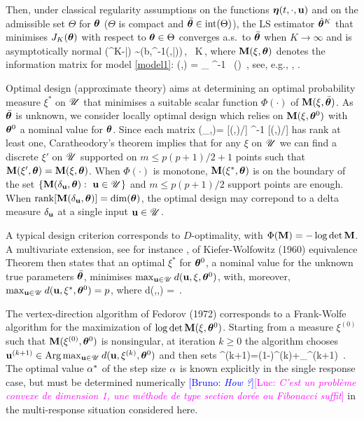 \documentclass{article}
\newcommand{\B}[1]{{\textcolor{blue}{[Bruno: \textit{#1}]}}}
\newcommand{\Luccomment}[1]{\todo[color=yellow]{#1}}
\newcommand{\Luc}[1]{{\textcolor{magenta}{[Luc: \textit{#1}]}}}
\begin{document}
Then, under classical regularity assumptions on the functions $\boldsymbol{\eta}(t,\cdot,\mathbf{u})$ and on the admissible set $\Theta$ for $\boldsymbol{\theta}$ ($\Theta$ is compact and $\bar{\boldsymbol{\theta}}\in \mathrm{int}(\Theta)$), the LS estimator $\hat{\boldsymbol{\theta}}^K$ that minimises $J_K(\boldsymbol{\theta})$ with respect to $\boldsymbol{\theta}\in\Theta$ converges a.s.\ to $\bar{\boldsymbol{\theta}}$ when $K\to\infty$ and is asymptotically normal
\bea
{} (\hat\mtb^K-\bar\mtb) \rad \zb \sim \SN\left(\0b,\Mb^{-1}(\xi,\bar\mtb)\right)\,, \ K\to\infty\,,
\eea
where $\mathbf{M}(\xi,\boldsymbol{\theta})$ denotes the information matrix for model \eqref{model1}:
\bea
\Mb(\xi,\mtb) = \int_\SU \frac{\mp\zetab\TT(\mt,\ub)}{\mp\mtb} \Sigmab^{-1} \frac{\mp\zetab(\mt,\ub)}{\mp\mtb\TT}\, \xi(\dd\ub) \,,
\eea
see, e.g., \cite[Chap.~3]{PP2013}, \cite[Chap.~1]{FedorovL2014}.

Optimal design (approximate theory) aims at determining an optimal probability measure $\xi^*$ on ${\mathscr U}$ that minimises a suitable scalar function $\Phi(\cdot)$ of $\mathbf{M}(\xi,\bar{\boldsymbol{\theta}})$. As $\bar{\boldsymbol{\theta}}$ is unknown, we consider locally optimal design which relies on $\mathbf{M}(\xi,\boldsymbol{\theta}^0)$ with $\boldsymbol{\theta}^0$ a nominal value for $\boldsymbol{\theta}$. Since each matrix
\bea
\Mb(\delta_\ub,\mtb)= [\mp\zetab\TT(\mt,\ub)/\mp\mtb] \Sigmab^{-1} [\mp\zetab(\mt,\ub)/\mp\mtb\TT]
\eea
has rank at least one, Caratheodory's theorem implies that for any $\xi$ on ${\mathscr U}$ we can find a discrete $\xi'$ on ${\mathscr U}$ supported on $m\leq p(p+1)/2+1$ points such that $\mathbf{M}(\xi',\boldsymbol{\theta})=\mathbf{M}(\xi,\boldsymbol{\theta})$. When $\Phi(\cdot)$ is monotone, $\mathbf{M}(\xi^*,\boldsymbol{\theta})$ is on the boundary of the set $\{\mathbf{M}(\delta_{\mathbf{u}},\boldsymbol{\theta}):\ \mathbf{u}\in{\mathscr U}\}$ and $m\leq p(p+1)/2$ support points are enough. When $\mathrm{rank}[\mathbf{M}(\delta_{\mathbf{u}},\boldsymbol{\theta})]=\mathrm{dim}(\boldsymbol{\theta})$, the optimal design may correpond to a delta measure $\delta_{\mathbf{u}}$ at a single input $\mathbf{u}\in{\mathscr U}$.

A typical design criterion corresponds to $D$-optimality, with $\Phi(\mathbf{M})=-\log\det \mathbf{M}$. A multivariate extension, see for instance \cite{HarmanT2009}, of Kiefer-Wolfowitz (1960)  equivalence Theorem \cite{KieferW60} then states that an optimal $\xi^*$ for $\boldsymbol{\theta}^0$, a nominal value for the unknown true parameters  $\bar{\boldsymbol{\theta}}$, minimises $\max_{\mathbf{u}\in{\mathscr U}} d(\mathbf{u},\xi,\boldsymbol{\theta}^0)$, with, moreover, $\max_{\mathbf{u}\in{\mathscr U}} d(\mathbf{u},\xi^*,\boldsymbol{\theta}^0)=p$, where
\beq\label{D-function-Sigma-known}
d(\ub,\xi,\mtb) = \tr{} \,.
\eeq

The vertex-direction algorithm of Fedorov (1972) \nocite{Fedorov72} %
corresponds to a Frank-Wolfe algorithm for the maximization of $\log\det \mathbf{M}(\xi,\boldsymbol{\theta}^0)$. Starting from a measure $\xi^{(0)}$ such that $\mathbf{M}(\xi^{(0)},\boldsymbol{\theta}^0)$ is nonsingular, 
at iteration $k\geq 0$ the algorithm chooses $\mathbf{u}^{(k+1)}\in\mathrm{Arg}\max_{\mathbf{u}\in{\mathscr U}} d(\mathbf{u},\xi^{(k)},\boldsymbol{\theta}^0)$ and then sets
\bea
\xi^{(k+1)}=(1-\ma)\xi^{(k)}+\ma\delta_{\ub^{(k+1)}} \,.
\eea
The optimal value $\alpha^*$ of the step size $\alpha$ is known explicitly in the single response case, but must be determined numerically \B{How ?}\Luc{C'est un problème convexe de dimension 1, une méthode de type section dorée ou Fibonacci suffit} in the multi-response situation considered here.
\end{document}

